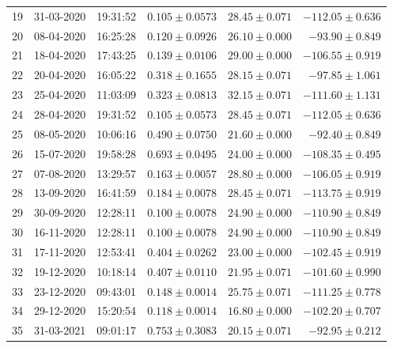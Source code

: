 \documentclass[times,twocolumn,final,authoryear]{elsarticle}
\begin{document}
\begin{table}
\begin{tabular}{|r|r|r|r|r|r|}
19 & 31-03-2020 & 19:31:52 & $0.105\pm 0.0573$ & $28.45 \pm 0.071$ & $-112.05 \pm  0.636$\\
20 & 08-04-2020 & 16:25:28 & $0.120\pm 0.0926$ & $26.10 \pm 0.000$ & $-93.90 \pm   0.849$\\
21 & 18-04-2020 & 17:43:25 & $0.139\pm 0.0106$ & $29.00 \pm 0.000$ & $-106.55 \pm  0.919$\\
22 & 20-04-2020 & 16:05:22 & $0.318\pm 0.1655$ & $28.15 \pm 0.071$ & $-97.85 \pm   1.061$\\
23 & 25-04-2020 & 11:03:09 & $0.323\pm 0.0813$ & $32.15 \pm 0.071$ & $-111.60 \pm  1.131$\\
24 & 28-04-2020 & 19:31:52 & $0.105\pm 0.0573$ & $28.45 \pm 0.071$ & $-112.05 \pm  0.636$\\
25 & 08-05-2020 & 10:06:16 & $0.490\pm 0.0750$ & $21.60 \pm 0.000$ & $-92.40 \pm   0.849$\\
26 & 15-07-2020 & 19:58:28 & $0.693\pm 0.0495$ & $24.00 \pm 0.000$ & $-108.35 \pm  0.495$\\
27 & 07-08-2020 & 13:29:57 & $0.163\pm 0.0057$ & $28.80 \pm 0.000$ & $-106.05 \pm  0.919$\\
28 & 13-09-2020 & 16:41:59 & $0.184\pm 0.0078$ & $28.45 \pm 0.071$ & $-113.75 \pm  0.919$\\
29 & 30-09-2020 & 12:28:11 & $0.100\pm 0.0078$ & $24.90 \pm 0.000$ & $-110.90 \pm  0.849$\\
30 & 16-11-2020 & 12:28:11 & $0.100\pm 0.0078$ & $24.90 \pm 0.000$ & $-110.90 \pm  0.849$\\
31 & 17-11-2020 & 12:53:41 & $0.404\pm 0.0262$ & $23.00 \pm 0.000$ & $-102.45 \pm  0.919$\\
32 & 19-12-2020 & 10:18:14 & $0.407\pm 0.0110$ & $21.95 \pm 0.071$ & $-101.60 \pm  0.990$\\
33 & 23-12-2020 & 09:43:01 & $0.148\pm 0.0014$ & $25.75 \pm 0.071$ & $-111.25 \pm  0.778$\\
34 & 29-12-2020 & 15:20:54 & $0.118\pm 0.0014$ & $16.80 \pm 0.000$ & $-102.20 \pm  0.707$\\
35 & 31-03-2021 & 09:01:17 & $0.753\pm 0.3083$ & $20.15 \pm 0.071$ & $-92.95 \pm  0.212$\\\hline
\end{tabular}
\end{table}
\end{document}
